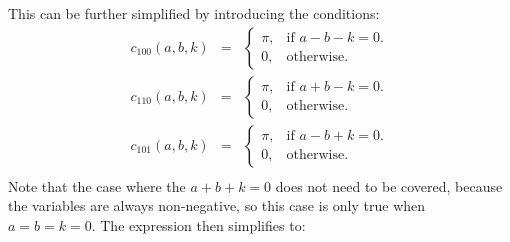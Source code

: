 \documentclass[12pt,onecolumn]{article}
\begin{document}
This can be further simplified by introducing the conditions:
\begin{eqnarray*}
  c_{100}(a,b,k)&=&\begin{cases}
    \pi, & \text{if $a - b - k = 0$}.\\
    0, & \text{otherwise}.
  \end{cases} \\
  c_{110}(a,b,k)&=&\begin{cases}
    \pi, & \text{if $a + b - k = 0$}.\\
    0, & \text{otherwise}.
  \end{cases} \\
  c_{101}(a,b,k)&=&\begin{cases}
    \pi, & \text{if $a - b + k = 0$}.\\
    0, & \text{otherwise}.
  \end{cases} \\
\end{eqnarray*}
Note that the case where the $a + b + k = 0$ does not need to be covered, because the variables are always non-negative, so this case is only true when $a  = b = k = 0$. The expression then simplifies to:
\end{document}
